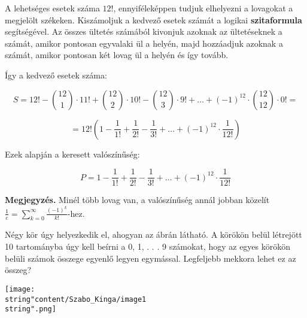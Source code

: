 \begin{solution}
A lehetséges esetek száma $12!$, ennyiféleképpen tudjuk elhelyezni
a lovagokat a megjelölt székeken. Kiszámoljuk a kedvező esetek számát
a logikai \textbf{szitaformula} segítségével. Az összes ültetés számából
kivonjuk azoknak az ültetéseknek a számát, amikor pontosan egyvalaki
ül a helyén, majd hozzáadjuk azoknak a számát, amikor pontosan két
lovag ül a helyén és így tovább.

Így a kedvező esetek száma:

\[
S=12!-\binom{12}{1}\cdot11!+\binom{12}{2}\cdot10!-\binom{12}{3}\cdot9!+\dots+(-1)^{12}\cdot\binom{12}{12}\cdot0!=
\]

\[
=12!\left(1-\frac{1}{1!}+\frac{1}{2!}-\frac{1}{3!}+\dots+(-1)^{12}\cdot\frac{1}{12!}\right)
\]

Ezek alapján a keresett valószínűség:

\[
P=1-\frac{1}{1!}+\frac{1}{2!}-\frac{1}{3!}+\dots+(-1)^{12}\cdot\frac{1}{12!}
\]

\textbf{Megjegyzés.} Minél több lovag van, a valószínűség annál jobban
közelít $\frac{1}{e}=\sum_{k=0}^{\infty}\frac{(-1)^{k}}{k!}$-hez.
\end{solution}
\begin{extraproblem}
Négy kör úgy helyezkedik el, ahogyan az ábrán látható. A körökön
belül létrejött 10 tartományba úgy kell beírni a 0, 1, . . . 9 számokat,
hogy az egyes körökön belüli számok összege egyenlő legyen egymással.
Legfeljebb mekkora lehet ez az összeg?
\begin{center}
\texttt{[image: \\string"content/Szabo\_Kinga/image1\\string".png]} 
\par\end{center}
\end{extraproblem}
